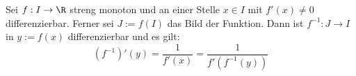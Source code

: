 Sei $f: I \to \R$ streng monoton und an einer Stelle $x \in I$ mit $f'(x) \neq 0$ differenzierbar. Ferner sei $J := f(I)$ das Bild der Funktion. Dann ist $f^{-1} : J \to I$ in $y := f(x)$ differenzierbar und es gilt:
$$\left( f^{-1} \right)'(y) = \frac{1}{f'(x)} = \frac{1}{f'(f^{-1}(y))}$$
